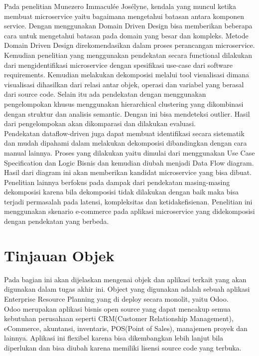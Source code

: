 \endgroup
Pada penelitian Munezero Immaculée Josélyne, kendala yang muncul ketika membuat  microservice yaitu bagaimana mengetahui batasan antara komponen service. Dengan menggunakan Domain Driven Design bisa memberikan beberapa cara untuk mengetahui batasan pada domain yang besar dan kompleks. Metode Domain Driven Design direkomendasikan dalam proses perancangan microservice. \\

Kemudian penelitian yang menggunakan pendekatan secara functional dilakukan dari mengidentifikasi microservice dengan spesifikasi use-case dari software requirements. Kemudian melakukan dekomposisi melalui tool visualisasi dimana visualisasi dihasilkan dari relasi antar objek, operasi dan variabel yang berasal dari source code.
Selain itu ada pendekatan dengan menggunakan pengelompokan khusus menggunakan hierarchical clustering yang dikombinasi dengan struktur dan analisis semantic. Dengan ini bisa mendeteksi outlier. Hasil dari pengelompokan akan dikomparasi dan dilakukan evaluasi.\\

Pendekatan dataflow-driven juga dapat membuat identifikasi secara sistematik dan mudah dipahami dalam melakukan dekomposisi dibandingkan dengan cara manual lainnya. Proses yang dilakukan yaitu dimulai dari menggunakan Use Case Specification dan Logic Bisnis dan kemudian diubah menjadi Data Flow diagram. Hasil dari diagram ini akan memberikan kandidat microservice yang bisa dibuat.\\

Penelitian lainnya berfokus pada dampak dari pendekatan masing-masing dekomposisi karena bila dekomposisi tidak dilakukan dengan baik maka bisa terjadi permasalah pada latensi, kompleksitas dan ketidakefisienan. Penelitian ini menggunakan skenario e-commerce pada aplikasi microservice yang didekomposisi dengan pendekatan yang berbeda.\\

\section{Tinjauan Objek}
Pada bagian ini akan dijelaskan mengenai objek dan aplikasi terkait yang akan digunakan dalam tugas akhir ini. Object yang digunakan adalah sebuah aplikasi Enterprise Resource Planning yang di deploy secara monolit, yaitu Odoo.\\

Odoo merupakan aplikasi bisnis open source yang dapat mencakup semua kebutuhan perusahaan seperti CRM(Customer Relationship Management), eCommerce, akuntansi, inventaris, POS(Point of Sales), manajemen proyek dan lainnya. Aplikasi ini flexibel karena bisa dikembangkan lebih lanjut bila diperlukan dan bisa diubah karena memiliki lisensi source code yang terbuka. \\

